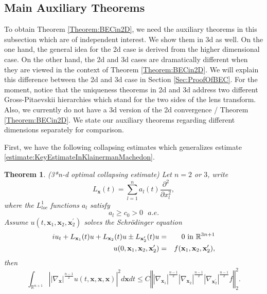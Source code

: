 \documentclass[reqno]{amsart}
\newtheorem{theorem}{Theorem}
\theoremstyle{plain}
\numberwithin{equation}{section}
\begin{document}
\subsection{Main Auxiliary Theorems}

To obtain Theorem \ref{Theorem:BECin2D}, we need the auxiliary theorems in
this subsection which are of independent interest. We show them in 3d as
well. On the one hand, the general idea for the 2d case is derived from the
higher dimensional case. On the other hand, the 2d and 3d cases are
dramatically different when they are viewed in the context of Theorem \ref{Theorem:BECin2D}. We will explain this difference between the 2d and 3d
case in Section \ref{Sec:ProofOfBEC}. For the moment, notice that the
uniqueness theorems in 2d and 3d address two different Gross-Pitaevskii
hierarchies which stand for the two sides of the lens transform. Also, we
currently do not have a 3d version of the 2d convergence / Theorem \ref{Theorem:BECin2D}. We state our auxiliary theorems regarding different
dimensions separately for comparison.

First, we have the following collapsing estimates which generalizes estimate \ref{estimate:KeyEstimateInKlainermanMachedon}.

\begin{theorem}
\label{Theorem:3*nd}(3*n-d optimal collapsing estimate) Let $n=2$ or $3$,
write 
\begin{equation*}
L_{\mathbf{x}}(t)=\sum_{l=1}^{n}a_{l}(t)\frac{\partial ^{2}}{\partial
x_{l}^{2}},
\end{equation*}where the $L_{loc}^{1}$ functions $a_{l}$ satisfy 
\begin{equation*}
a_{l}\geqslant c_{0}>0\text{ }a.e.
\end{equation*}Assume $u(t,\mathbf{x}_{1},\mathbf{x}_{2},\mathbf{x}_{2}^{\prime })$ solves
the Schr\"{o}dinger equation 
\begin{eqnarray}
iu_{t}+L_{\mathbf{x}_{1}}(t)u+L_{\mathbf{x}_{2}}(t)u\pm L_{\mathbf{x}_{2}^{\prime }}(t)u &=&0\text{ in }\mathbb{R}^{3n+1}  \label{eqn:3*3d} \\
u(0,\mathbf{x}_{1},\mathbf{x}_{2},\mathbf{x}_{2}^{\prime }) &=&f(\mathbf{x}_{1},\mathbf{x}_{2},\mathbf{x}_{2}^{\prime }),  \notag
\end{eqnarray}then\begin{equation*}
\int_{\mathbb{R}^{n+1}}\left\vert \left\vert \nabla _{\mathbf{x}}\right\vert
^{\frac{n-1}{2}}u(t,\mathbf{x},\mathbf{x},\mathbf{x})\right\vert ^{2}d\mathbf{x}dt\leqslant C\left\Vert \left\vert \nabla _{\mathbf{x}_{1}}\right\vert ^{\frac{n-1}{2}}\left\vert \nabla _{\mathbf{x}_{2}}\right\vert ^{\frac{n-1}{2}}\left\vert \nabla _{\mathbf{x}_{2}^{\prime
}}\right\vert ^{\frac{n-1}{2}}f\right\Vert _{2}^{2}.
\end{equation*}
\end{theorem}
\end{document}

